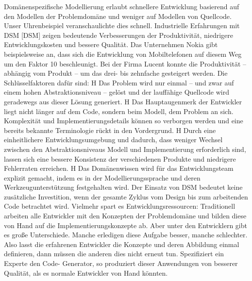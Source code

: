 \documentclass[11pt,english,ngerman, headsepline]{scrreprt}
\begin{document}
Domänenspezifische Modellierung erlaubt schnellere Entwicklung
basierend auf den Modellen der Problemdomäne und weniger auf
Modellen von Quellcode. Unser Uhrenbeispiel veranschaulichte dies
schnell. Industrielle Erfahrungen mit DSM [DSM] zeigen bedeutende
Verbesserungen der Produktivität, niedrigere Entwicklungskosten
und bessere Qualität. Das Unternehmen Nokia gibt beispielsweise
an, dass sich die Entwicklung von Mobiltelefonen auf
diesem Weg um den Faktor 10 beschleunigt. Bei der Firma Lucent
konnte die Produktivität – abhängig vom Produkt – um das drei- bis
zehnfache gesteigert werden. Die Schlüsselfaktoren dafür sind:
H Das Problem wird nur einmal – und zwar auf einem hohen
Abstraktionsniveau – gelöst und der lauffähige Quellcode
wird geradewegs aus dieser Lösung generiert.
H Das Hauptaugenmerk der Entwickler liegt nicht länger auf dem
Code, sondern beim Modell, dem Problem an sich. Komplexität
und Implementierungsdetails können so verborgen werden und
eine bereits bekannte Terminologie rückt in den Vordergrund.
H Durch eine einheitlichere Entwicklungsumgebung und dadurch,
dass weniger Wechsel zwischen den Abstraktionsniveaus
Modell und Implementierung erforderlich sind, lassen
sich eine bessere Konsistenz der verschiedenen Produkte
und niedrigere Fehlerraten erreichen.
H Das Domänenwissen wird für das Entwicklungsteam explizit
gemacht, indem es in der Modellierungssprache und deren
Werkzeugunterstützung festgehalten wird.
Der Einsatz von DSM bedeutet keine zusätzliche Investition,
wenn der gesamte Zyklus vom Design bis zum arbeitenden
Code betrachtet wird. Vielmehr spart es Entwicklungsressourcen:
Traditionell arbeiten alle Entwickler mit den Konzepten der
Problemdomäne und bilden diese von Hand auf die Implementierungskonzepte
ab. Aber unter den Entwicklern gibt es große
Unterschiede. Manche erledigen diese Aufgabe besser, manche
schlechter. Also lasst die erfahrenen Entwickler die Konzepte
und deren Abbildung einmal definieren, dann müssen die anderen
dies nicht erneut tun. Spezifiziert ein Experte den Code-
Generator, so produziert dieser Anwendungen von besserer
Qualität, als es normale Entwickler von Hand könnten.
 \cite{dsmUhrenArtikel}
 
 

\clearpage{}
\appendix
\renewcommand{\theequation}{A-\arabic{equation}}

\setcounter{equation}{0}  %




\end{document}
